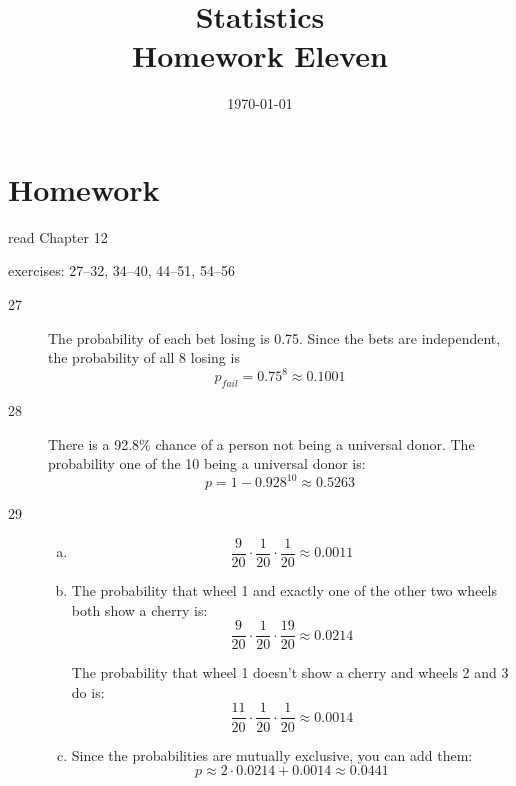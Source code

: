 \documentclass[letterpaper, landscape]{exam}
\title{Statistics \\ Homework Eleven}
\date{\today}
\author{}
\begin{document}
  \maketitle

  \section{Homework}
  \ifprintanswers{}
  \else
    \begin{itemize*}
      \item read Chapter 12 
      \item exercises: 27--32, 34--40, 44--51, 54--56
    \end{itemize*}
  \fi

  \ifprintanswers{}
    \begin{description}

      \item[27] 
        The probability of each bet losing is 0.75. Since the bets are
        independent, the probability of all 8 losing is
        \[
          p_{fail} = 0.75^8 \approx \boxed{ 0.1001 }
        \]

      \item[28]
        There is a 92.8\% chance of a person not being a universal donor. The
        probability one of the 10 being a universal donor is:
        \[
          p = 1 - 0.928^{10} \approx \boxed{ 0.5263 }
        \]

      \item[29]
        \begin{enumerate}[(a)]
          \item 
            \[
              \frac{9}{20} \cdot \frac{1}{20} \cdot \frac{1}{20} 
                \approx \boxed{ 0.0011 }
            \]

          \item
              The probability that wheel 1 and exactly one of the other two
              wheels both show a cherry is:
              \[
                \frac{9}{20} \cdot \frac{1}{20} \cdot \frac{19}{20} 
                  \approx \boxed{ 0.0214 }
              \]

              The probability that wheel 1 doesn't show a cherry and wheels 2 and 3 
              do is:
              \[
                \frac{11}{20} \cdot \frac{1}{20} \cdot \frac{1}{20} 
                  \approx \boxed{ 0.0014 }
              \]

            \item
              Since the probabilities are mutually exclusive, you can add them:
              \[
                p \approx 2 \cdot 0.0214 + 0.0014 \approx \boxed{ 0.0441 } 
              \]
        \end{enumerate}


\end{description}
\end{document}
